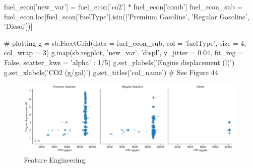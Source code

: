 \begin{python}
	fuel_econ['new_var'] = fuel_econ['co2'] * fuel_econ['comb']
	fuel_econ_sub = fuel_econ.loc[fuel_econ['fuelType'].isin(['Premium Gasoline', 'Regular Gasoline', 'Diesel'])]
	
	# plotting
	g = sb.FacetGrid(data = fuel_econ_sub, col = 'fuelType', size = 4, col_wrap = 3)
	g.map(sb.regplot, 'new_var', 'displ', y_jitter = 0.04, fit_reg = False, scatter_kws = {'alpha' : 1/5})
	g.set_ylabels('Engine displacement (l)')
	g.set_xlabels('CO2 (g/gal)')
	g.set_titles('{col_name}')
	# See Figure 44
\end{python}

\begin{figure}
	\includegraphics[width=\textwidth,height=\textheight,keepaspectratio]{images/figure44.png}
	\caption{Feature Engineering.}\label{fig:figure44}
\end{figure}